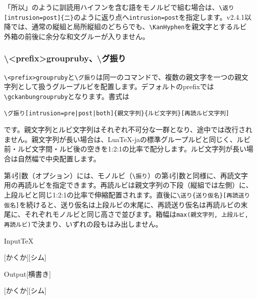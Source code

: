 \documentclass[luatex,fontsize=8pt,paper=b5,twoside]{jlreq}%
\begin{document}
「所以」のように訓読用ハイフンを含む語をモノルビで組む場合は、\verb|\返り[intrusion=post]{二}|のように返り点へ\verb|intrusion=post|を指定します。v2.4.1以降では、通常の縦組と局所縦組のどちらでも、\verb|\KanHyphen|を親文字とするルビ外箱の前後に余分な和文グルーが入りません。

\subsubsection{\textbackslash <prefix>groupruby、\textbackslash グ振り}

\verb|\<prefix>groupruby|と\verb|\グ振り|は同一のコマンドで、複数の親文字を一つの親文字列として扱うグループルビを配置します。デフォルトのprefixでは\verb|\gckanbungroupruby|となります。書式は

\begin{verbatim}
\グ振り[intrusion=pre|post|both]{親文字列}{ルビ文字列}[再読ルビ文字列]
\end{verbatim}

\noindent です。親文字列とルビ文字列はそれぞれ不可分な一群となり、途中では改行されません。親文字列が長い場合は、LuaTeX-jaの標準グループルビと同じく、ルビ前・ルビ文字間・ルビ後の空きを1:2:1の比率で配分します。ルビ文字列が長い場合は自然幅で中央配置します。

第4引数（オプション）には、モノルビ（\verb|\振り|）の第4引数と同様に、再読文字用の再読ルビを指定できます。再読ルビは親文字列の下段（縦組では左側）に、上段ルビと同じ1:2:1の比率で伸縮配置されます。直後に\verb|\送り{送り仮名}[再読送り仮名]|を続けると、送り仮名は上段ルビの末尾に、再読送り仮名は再読ルビの末尾に、それぞれモノルビと同じ高さで並びます。箱幅は\verb|max(親文字列, 上段ルビ, 再読ルビ)|で決まり、いずれの段もはみ出しません。

\begin{SourceCode}{Input}{TeX}



  [かくか][シム]
\end{SourceCode}

\begin{OutPut}{Output}[横書き]



  [かくか][シム]
\end{OutPut}
\end{document}
